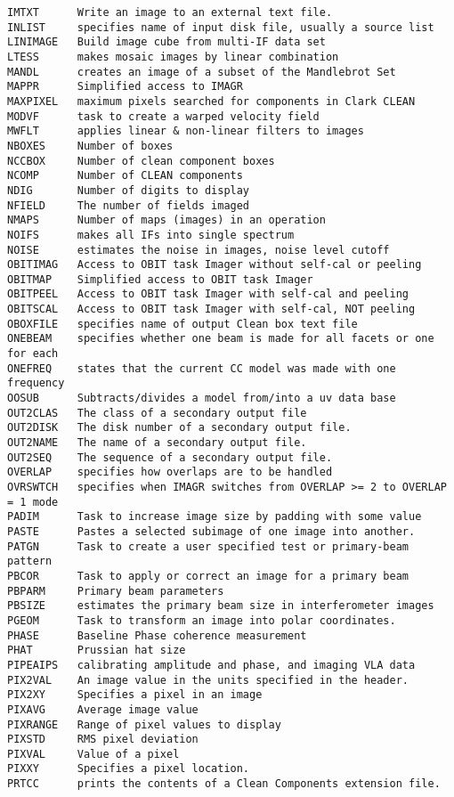 \begin{verbatim}
IMTXT      Write an image to an external text file.
INLIST     specifies name of input disk file, usually a source list
LINIMAGE   Build image cube from multi-IF data set
LTESS      makes mosaic images by linear combination
MANDL      creates an image of a subset of the Mandlebrot Set
MAPPR      Simplified access to IMAGR
MAXPIXEL   maximum pixels searched for components in Clark CLEAN
MODVF      task to create a warped velocity field
MWFLT      applies linear & non-linear filters to images
NBOXES     Number of boxes
NCCBOX     Number of clean component boxes
NCOMP      Number of CLEAN components
NDIG       Number of digits to display
NFIELD     The number of fields imaged
NMAPS      Number of maps (images) in an operation
NOIFS      makes all IFs into single spectrum
NOISE      estimates the noise in images, noise level cutoff
OBITIMAG   Access to OBIT task Imager without self-cal or peeling
OBITMAP    Simplified access to OBIT task Imager
OBITPEEL   Access to OBIT task Imager with self-cal and peeling
OBITSCAL   Access to OBIT task Imager with self-cal, NOT peeling
OBOXFILE   specifies name of output Clean box text file
ONEBEAM    specifies whether one beam is made for all facets or one for each
ONEFREQ    states that the current CC model was made with one frequency
OOSUB      Subtracts/divides a model from/into a uv data base
OUT2CLAS   The class of a secondary output file
OUT2DISK   The disk number of a secondary output file.
OUT2NAME   The name of a secondary output file.
OUT2SEQ    The sequence of a secondary output file.
OVERLAP    specifies how overlaps are to be handled
OVRSWTCH   specifies when IMAGR switches from OVERLAP >= 2 to OVERLAP = 1 mode
PADIM      Task to increase image size by padding with some value
PASTE      Pastes a selected subimage of one image into another.
PATGN      Task to create a user specified test or primary-beam pattern
PBCOR      Task to apply or correct an image for a primary beam
PBPARM     Primary beam parameters
PBSIZE     estimates the primary beam size in interferometer images
PGEOM      Task to transform an image into polar coordinates.
PHASE      Baseline Phase coherence measurement
PHAT       Prussian hat size
PIPEAIPS   calibrating amplitude and phase, and imaging VLA data
PIX2VAL    An image value in the units specified in the header.
PIX2XY     Specifies a pixel in an image
PIXAVG     Average image value
PIXRANGE   Range of pixel values to display
PIXSTD     RMS pixel deviation
PIXVAL     Value of a pixel
PIXXY      Specifies a pixel location.
PRTCC      prints the contents of a Clean Components extension file.

\end{verbatim}
